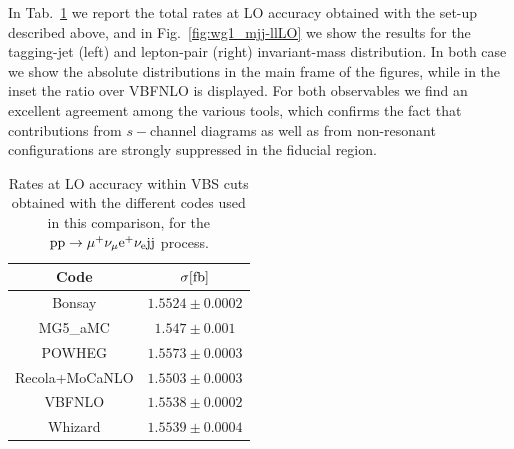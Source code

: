 In Tab.~\ref{tab:wg1_LOrates} we report the total rates at LO accuracy obtained with the set-up described above, and in Fig.~\ref{fig:wg1_mjj-llLO} we show the results
for the tagging-jet (left) and lepton-pair (right) invariant-mass distribution. In both case we show the absolute distributions in the main frame of the 
figures, while in the inset the ratio over {\sc VBFNLO} is displayed. For both observables we find 
an excellent agreement among the various tools, which confirms the fact
that contributions from $s-$channel diagrams as well as from non-resonant configurations are strongly suppressed in the fiducial region.
\begin{table}[h!]
    \centering
    \begin{tabular}{c|c}
        Code  &  $\sigma[\rm{fb}]$  \\
        \hline
        \hline
        {\sc Bonsay}  &  $1.5524 \pm 0.0002$ \\
        {\sc MG5\_aMC}&  $1.547 \pm 0.001$  \\ 
        {\sc POWHEG}  &  $1.5573 \pm 0.0003$ \\
        {\sc Recola+MoCaNLO}  &  $1.5503 \pm 0.0003$ \\
        {\sc VBFNLO}  &  $1.5538 \pm 0.0002$ \\
        {\sc Whizard}&  $ 1.5539 \pm 0.0004 $   
    \end{tabular}
    \caption{\label{tab:wg1_LOrates} Rates at LO accuracy within VBS cuts obtained with the different codes used in this comparison, 
    for the ${\rm p}{\rm p}\to\mu^+\nu_\mu{\rm e}^+\nu_{\rm e}{\rm j}{\rm j}$ process.}
\end{table}
%
